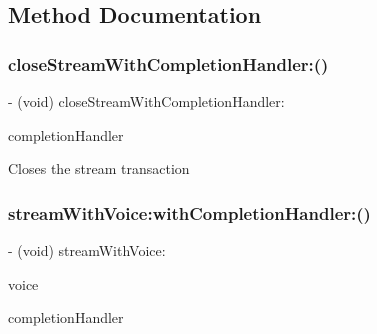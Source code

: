 \subsection{Method Documentation}
\hypertarget{interface_s_t_c_t_t_s_stream_networking_manager_a2291cf3c0fa6035f4cc848712685a0b4}{}\label{interface_s_t_c_t_t_s_stream_networking_manager_a2291cf3c0fa6035f4cc848712685a0b4} 
\subsubsection{\texorpdfstring{close\+Stream\+With\+Completion\+Handler\+:()}{closeStreamWithCompletionHandler:()}}
{\footnotesize\ttfamily -\/ (void) close\+Stream\+With\+Completion\+Handler\+: \begin{DoxyParamCaption}\item[{(Completion\+Handler)}]{completion\+Handler }\end{DoxyParamCaption}}

Closes the stream transaction \hypertarget{interface_s_t_c_t_t_s_stream_networking_manager_a39c01a6d865cccc493eac9642ff7d3d4}{}\label{interface_s_t_c_t_t_s_stream_networking_manager_a39c01a6d865cccc493eac9642ff7d3d4} 
\subsubsection{\texorpdfstring{stream\+With\+Voice\+:with\+Completion\+Handler\+:()}{streamWithVoice:withCompletionHandler:()}}
{\footnotesize\ttfamily -\/ (void) stream\+With\+Voice\+: \begin{DoxyParamCaption}\item[{(N\+S\+String $\ast$)}]{voice }\item[{withCompletionHandler:(Completion\+Handler)}]{completion\+Handler }\end{DoxyParamCaption}}

